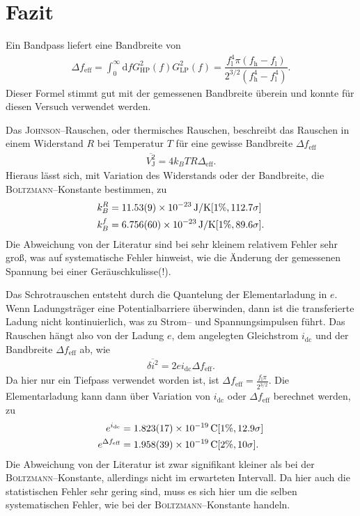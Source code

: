 \documentclass[sn-mathphys-num,iicol]{sn-jnl}
\theoremstyle{thmstyleone}
\theoremstyle{thmstyletwo}
\theoremstyle{thmstylethree}
\newcommand{\td}{\text{d}}
\begin{document}
\section{Fazit}
Ein Bandpass liefert eine Bandbreite von
\begin{align}
	\Delta f_\text{eff}=\int_{0}^{\infty}\td fG_\text{HP}^2(f)G_\text{LP}^2(f)=\dfrac{f_\text{l}^4\pi \left(f_\text{h}-f_\text{l}\right)}{2^{3/2}\left(f_\text{h}^4-f_\text{l}^4\right)}
	.\end{align}
Dieser Formel stimmt gut mit der gemessenen Bandbreite überein und konnte für diesen Versuch verwendet werden.

Das \textsc{Johnson}--Rauschen, oder thermisches Rauschen, beschreibt das Rauschen in einem Widerstand $R$ bei Temperatur $T$ für eine gewisse Bandbreite $\Delta f_\text{eff}$
\begin{align}
	\overline{V_\text{J}^2}=4k_BTR\Delta _\text{eff}
	.\end{align}
Hieraus lässt sich, mit Variation des Widerstands oder der Bandbreite, die \textsc{Boltzmann}--Konstante bestimmen, zu
\begin{align}
	k_B^R & = \SI{11.53+-0.09e-23}{J/K}[1\%,112.7\sigma ] \\
	k_B^f & = \SI{6.756+-0.06e-23}{J/K}[1\%,89.6\sigma ]
	.\end{align}
Die Abweichung von der Literatur sind bei sehr kleinem relativem Fehler sehr groß, was auf systematische Fehler hinweist, wie die Änderung der gemessenen Spannung bei einer Geräuschkulisse(!).

Das Schrotrauschen entsteht durch die Quantelung der Elementarladung in $e$.
Wenn Ladungsträger eine Potentialbarriere überwinden, dann ist die transferierte Ladung nicht kontinuierlich, was zu Strom-- und Spannungsimpulsen führt.
Das Rauschen hängt also von der Ladung $e$, dem angelegten Gleichstrom $i_\text{dc}$ und der Bandbreite $\Delta f_\text{eff}$ ab, wie
\begin{align}
	\overline{\delta i^2}=2ei_\text{dc}\Delta f_\text{eff}
	.\end{align}
Da hier nur ein Tiefpass verwendet worden ist, ist $\Delta f_\text{eff}=\tfrac{f_\text{l}\pi }{2^{3/2}}$.
Die Elementarladung kann dann über Variation von $i_\text{dc}$ oder $\Delta f_\text{eff}$ berechnet werden, zu
\begin{align}
	e^{i_\text{dc}}         & = \SI{1.823+-0.017e-19}{C}[1\%,12.9\sigma ] \\
	e^{\Delta f_\text{eff}} & = \SI{1.958+-0.039e-19}{C}[2\%,10\sigma ]
	.\end{align}
Die Abweichung von der Literatur ist zwar signifikant kleiner als bei der \textsc{Boltzmann}--Konstante, allerdings nicht im erwarteten Intervall.
Da hier auch die statistischen Fehler sehr gering sind, muss es sich hier um die selben systematischen Fehler, wie bei der \textsc{Boltzmann}--Konstante handeln.
\end{document}
